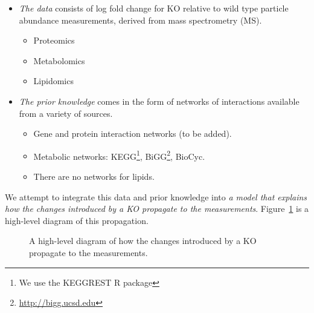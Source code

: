 \documentclass{article}
\begin{document}
\begin{itemize}
 \item \emph{The data} consists of log fold change for KO relative to wild type particle abundance measurements, derived from mass spectrometry (MS).
 \begin{itemize}
  \item Proteomics
  \item Metabolomics
  \item Lipidomics
 \end{itemize}
 \item \emph{The prior knowledge} comes in the form of networks of interactions available from a variety of sources.
 \begin{itemize}
  \item Gene and protein interaction networks (to be added).
  \item Metabolic networks: KEGG\footnote{We use the KEGGREST R package}, BiGG\footnote{\url{http://bigg.ucsd.edu}}, BioCyc.
  \item There are no networks for lipids.
 \end{itemize}
\end{itemize}

We attempt to integrate this data and prior knowledge into \emph{a model that explains how the changes introduced by a KO propagate to the measurements}.
Figure~\ref{fig:high-level} is a high-level diagram of this propagation.

\begin{figure}
\centering
{}
\caption{A high-level diagram of how the changes introduced by a KO propagate to the measurements.}
\label{fig:high-level}
\end{figure}
\end{document}
